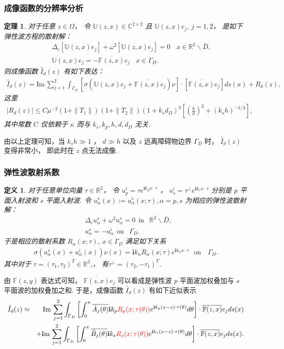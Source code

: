 \documentclass[8pt]{beamer}
\newcommand{\R}{\mathbb{R}}
\renewcommand{\i}{\mathbf{i}}
\renewcommand{\Im}{\mathrm{Im}\,}
\newtheorem{them}{定理}[section]
\newtheorem{deff}{定义}[section]
\newcommand{\om}{\omega}
\newcommand{\al}{\alpha}
\newcommand{\Ga}{\Gamma}
\newcommand{\De}{\Delta}
\newcommand{\bks}{\backslash}
\renewcommand{\i}{\mathbf{i}}
\renewcommand{\C}{{\mathbb{C}}}
\renewcommand{\Im}{\mathrm{Im}\,}
\newcommand{\F}{\mathbb{F}}
\renewcommand{\U}{\mathbb{U}}
\newcommand{\ben}{\begin{eqnarray*}}
\newcommand{\een}{\end{eqnarray*}}
\begin{document}
\begin{frame}
\frametitle{成像函数的分辨率分析}
\begin{them}\label{thm:4.3}
	对于任意 $z\in\Omega$， 令 $\U(z,x)\in\C^{2\times2}$ 且 $\U(z,x)e_j$, $j=1,2$， 是如下弹性波方程的散射解：
	\ben
	& &\Delta_e [\U(z,x)e_j]+ \omega^2[\U(z,x)e_j]= 0 \ \  \ \ x\in\R^2\bks \bar{D},  \\
	& &
	\U(z,x)e_j= -\overline{\F(z,x)}e_j \ \  \ \ x\in\Ga_D.  
	\een
	则成像函数 $\hat{I}_d(z)$ 有如下表达：
	\ben
	\hat{I}_d(z)=\Im\sum_{j=1}^2\int_{\Gamma_D}[\sigma(\U(z,x)e_j+\overline{\F(z,x)}e_j)\nu]\cdot [\overline{\F(z,x)}e_j]ds(x)+R_d(z),\label{id}
	\een
	这里 
	\ben
	|R_d(z)|\leq C\mu^{-2}(1+\|T_1\|)(1+\|T_2\|)(1+k_s d_D)^3\left[\left(\frac hd\right)^{2}+(k_sh)^{-1/4}\right],
	\een
	其中常数 $C$ 仅依赖于 $\kappa$ 而与 $k_s,k_p, h, d, d_D$ 无关.
\end{them}
由以上定理可知，当 $k_s h \gg 1$ ， $d\gg h$ 以及 $z$ 远离障碍物边界 $\Ga_D$ 时， $\hat{I}_d(z)$ 变得非常小， 即此时在 $z$ 点无法成像.
\end{frame}

\begin{frame}
	\frametitle{弹性波散射系数}
	\begin{deff}\label{scarr_con}
		对于任意单位向量 $\tau\in \R^2$， 令 $u^i_p =\tau e^{\i k_p x\cdot \tau}$ ，  $u^i_s= \tau^\perp e^{\i k_s x\cdot \tau}$ 分别是 $p$ 平面入射波和 $s$ 平面入射波.   令 $u^s_\alpha (x) := u^s_\alpha(x;\tau), \al=p,s$ 为相应的弹性波散射解：
		\ben\label{sc1}
		& &\De_e u^s_\alpha + \om^2u^s_\alpha = 0\ \ \mbox{in }   \ \ \R^2\bks\bar{D}, \ \ \ \  \\
		& & u^s_\alpha =-u^i_\alpha \ \ \mbox{on }  \ \ \Ga_D.
		\een
		于是相应的散射系数 $R_\al(x;\tau)$, $x\in\Ga_D$ 满足如下关系
		\ben
		\sigma(u^s_\alpha(x)+u^i_\alpha(x))\nu(x)= \i k_\alpha R_\alpha(x;\tau)e^{\i k_\alpha x\cdot \tau}  \ \ \ \mbox{on } \ \ \  \Ga_D.
		\een
		其中对于 $\tau=(\tau_1,\tau_2)^T\in\R^2$,， 有$\tau^\perp=(\tau_2,-\tau_1)^T$.
	\end{deff}
由 $\F(z,y)$ 表达式可知， $\overline{\F(z,x)}e_j$ 可以看成是弹性波 $p$ 平面波加权叠加与 $s$ 平面波的加权叠加之和. 于是，成像函数 $\hat{I}_d(z)$ 有如下近似表示
\ben
\hat I_d(z)&\approx&\Im\sum^2_{j=1}\int_{\Ga_D}\left[
\int^\pi_0\overline{\tilde A_j(\theta)}\i k_p\textcolor{red}{R_p(x;\tau(\theta))}e^{\i k_p(x-z)\cdot\tau(\theta)}d\theta\right]\cdot\overline{\F(z,x)}e_j ds(x)\\
& &+\Im\sum^2_{j=1}\int_{\Ga_D}\left[
\int^\pi_0\overline{\tilde B_j(\theta)}\i k_s\textcolor{red}{R_s(x;\tau(\theta))}e^{\i k_s(x-z)\cdot\tau(\theta)}d\theta\right]\cdot\overline{\F(z,x)}e_j ds(x).
\een
\end{frame}
\end{document}
